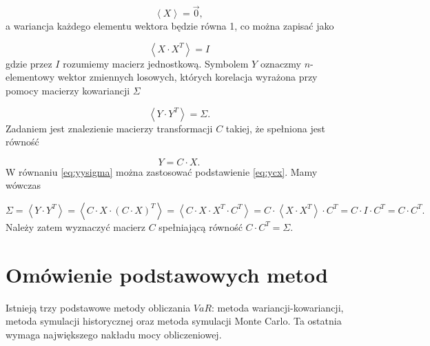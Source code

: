 \documentclass[11pt,titlepage]{article}
\numberwithin{equation}{section}
\begin{document}
\begin{equation}
\left \langle X \right \rangle = \vec{0},
\end{equation} 
a wariancja każdego elementu wektora będzie równa 1, co można zapisać jako


\begin{equation}
\left \langle X \cdot X^T \right \rangle = I
\end{equation} 
gdzie przez $I$ rozumiemy macierz jednostkową. Symbolem $Y$ oznaczmy $n$-elementowy wektor zmiennych losowych, których korelacja wyrażona przy pomocy macierzy kowariancji $\Sigma$


\begin{equation}\label{eq:yysigma}
\left \langle Y \cdot Y^T \right \rangle = \Sigma.
\end{equation} 
Zadaniem jest znalezienie macierzy transformacji $C$ takiej, że spełniona jest równość

\begin{equation}\label{eq:ycx}
Y=C \cdot X.
\end{equation} 
W równaniu \eqref{eq:yysigma} można zastosować podstawienie \eqref{eq:ycx}. Mamy wówczas

\begin{equation}
\Sigma = \left \langle Y \cdot Y^T \right \rangle = \left \langle C \cdot X \cdot (C \cdot X)^T \right \rangle =
\left \langle C \cdot X \cdot X^T \cdot C^T \right \rangle =  C \cdot \left \langle X \cdot X^T \right \rangle \cdot C^T =
C \cdot I \cdot C^T = C \cdot C^T.
\end{equation} 
Należy zatem wyznaczyć macierz $C$ spełniającą równość $C \cdot C^T = \Sigma$.























\section{Omówienie podstawowych metod}
Istnieją trzy podstawowe metody obliczania $VaR$: metoda wariancji-kowariancji, metoda symulacji historycznej oraz metoda symulacji Monte Carlo. Ta ostatnia wymaga największego nakładu mocy obliczeniowej.
\end{document}
